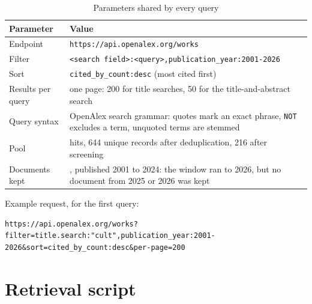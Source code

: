 {\scriptsize
\renewcommand{\arraystretch}{1.3}
\begin{longtable}{@{}>{\raggedright\arraybackslash}p{}>{\raggedright\arraybackslash}p{}@{}}
\caption{Parameters shared by every query}\label{tab:openalex_parameters} \\
\toprule
Parameter & Value \\
\midrule
\endfirsthead
\bottomrule
\endfoot
Endpoint & \texttt{https://api.openalex.org/works} \\
Filter & \texttt{<search field>:<query>,publication\_year:2001-2026} \\
Sort & \texttt{cited\_by\_count:desc} (most cited first) \\
Results per query & one page: 200 for title searches, 50 for the title-and-abstract search \\
Query syntax & OpenAlex search grammar: quotes mark an exact phrase, \texttt{NOT} excludes a term, unquoted terms are stemmed \\
Pool & 668 hits, 644 unique records after deduplication, 216 after screening \\
Documents kept & 68, published 2001 to 2024: the window ran to 2026, but no document from 2025 or 2026 was kept \\
\end{longtable}
}

Example request, for the first query:

\begin{lstlisting}[basicstyle=\scriptsize\ttfamily,breaklines=true,frame=single,columns=fullflexible]
https://api.openalex.org/works?filter=title.search:"cult",publication_year:2001-2026&sort=cited_by_count:desc&per-page=200
\end{lstlisting}

\section{Retrieval script}
\label{sec:openalex_script}


